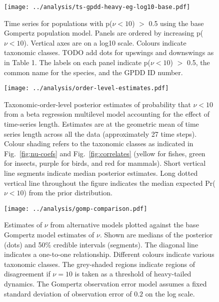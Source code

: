 \begin{figure}[htbp]
\begin{center}
\texttt{[image: ../analysis/ts-gpdd-heavy-eg-log10-base.pdf]}
\caption{
  Time series for populations with p($\nu < 10$) $>$ 0.5 using the base
  Gompertz population model. Panels are ordered by increasing p($\nu < 10$).
  Vertical axes are on a log10 scale. Colours indicate taxonomic classes. TODO
  add dots for upswings and downswings as in Table 1. The labels on each panel
  indicate p($\nu < 10$) $>$ 0.5, the common name for the species, and the GPDD
  ID number.
}
\label{fig:heavy-ts}
\end{center}
\end{figure}

\clearpage

\begin{figure}[htbp]
\begin{center}
\texttt{[image: ../analysis/order-level-estimates.pdf]}
\caption{
  Taxonomic-order-level posterior estimates of probability that $\nu < 10$ from
  a beta regression multilevel model accounting for the effect of time-series
  length. Estimates are at the geometric mean of time series length across all
  the data (approximately 27 time steps). Colour shading refers to the
  taxonomic classes as indicated in Fig.~\ref{fig:nu-coefs} and
  Fig.~\ref{fig:correlates} (yellow for fishes, green for insects, purple for
  birds, and red for mammals). Short vertical line segments indicate median
  posterior estimates. Long dotted vertical line throughout the figure
  indicates the median expected Pr($\nu < 10$) from the prior distribution.
}
\label{fig:order-estimates}
\end{center}
\end{figure}

\clearpage

\begin{figure}[htbp]
\begin{center}
\texttt{[image: ../analysis/gomp-comparison.pdf]}
\caption{
  Estimates of $\nu$ from alternative models plotted against the base Gompertz
  model estimates of $\nu$. Shown are medians of the posterior (dots) and 50\%
  credible intervals (segments). The diagonal line indicates a one-to-one
  relationship. Different colours indicate various taxonomic classes. The
  grey-shaded regions indicate regions of disagreement if $\nu = 10$ is taken
  as a threshold of heavy-tailed dynamics. The Gompertz observation error model
  assumes a fixed standard deviation of observation error of $0.2$ on the log
  scale.
}
\label{fig:alt}
\end{center}
\end{figure}

